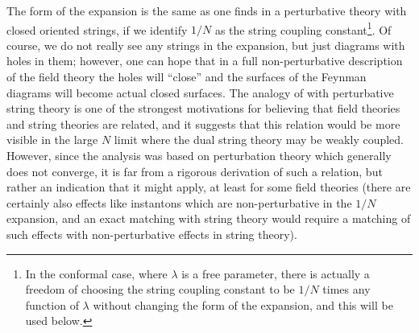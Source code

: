 The form of the expansion  is the same as one finds in
a perturbative theory with closed oriented strings, if we identify
$1/N$ as the string coupling constant\footnote{In the conformal case,
where $\lambda$ is a free parameter, there is actually a freedom of
choosing the string coupling constant to be $1/N$ times any function
of $\lambda$ without changing the form of the expansion, and this will
be used below.}. Of course, we do not really see
any strings in the expansion, but just diagrams with holes in them;
however, one can hope that in a full non-perturbative description of
the field theory the holes will ``close'' and the surfaces of the Feynman
diagrams will become actual closed surfaces. The analogy of
 with perturbative string theory is one of
the strongest motivations for believing that field theories and string
theories are related, and it suggests that this relation would be more
visible in the large $N$ limit where the dual string theory may be
weakly coupled. However, since the analysis was based on perturbation
theory which generally does not converge, it is far from a rigorous
derivation of such a relation, but rather an indication that it might
apply, at least for some field theories (there are certainly also
effects like instantons which are non-perturbative in the $1/N$
expansion, and an exact matching with string theory would require a
matching of such effects with non-perturbative effects in string
theory).

